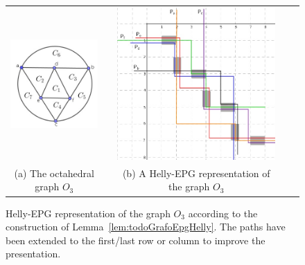 
\begin{figure}[ht]
  \centering
  \begin{tabular}{c c c c c }
    \includegraphics[width=3.5cm]{./img/octaCliques} &&   
    \includegraphics[width=9cm]{./img/representacaoLB}\\
    {\footnotesize (a) The octahedral graph $O_3$\vspace{.1cm}}&& 
    {\footnotesize (b) A Helly-EPG representation of the graph $O_3$} 
  \end{tabular}
  \caption{Helly-EPG representation of the graph $O_3$ according to the construction of Lemma~\ref{lem:todoGrafoEpgHelly}. The paths have been extended to the first/last row or column to improve the presentation.}\label{fig:gradeDemonstracao}
\end{figure} 
 